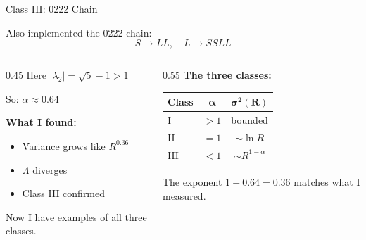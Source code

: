 \documentclass[aspectratio=169, 11pt]{beamer}
\begin{document}
\begin{frame}{Class III: 0222 Chain}

Also implemented the 0222 chain:
\[
S \to LL, \quad L \to SSLL
\]

\begin{columns}[T]
\begin{column}{0.45\textwidth}
\vspace{0.5em}
Here $|\lambda_2| = \sqrt{5} - 1 > 1$

So: $\alpha \approx 0.64$

\vspace{0.5em}
\textbf{What I found:}
\begin{itemize}
    \item Variance grows like $R^{0.36}$
    \item $\bar{\Lambda}$ diverges
    \item Class III confirmed
\end{itemize}

\vspace{0.5em}
Now I have examples of all three classes.
\end{column}

\begin{column}{0.55\textwidth}
\centering
\small
\textbf{The three classes:}
\vspace{0.3em}

\begin{tabular}{lcc}
\toprule
\textbf{Class} & $\boldsymbol{\alpha}$ & $\boldsymbol{\sigma^2(R)}$ \\
\midrule
I & $> 1$ & bounded \\
II & $= 1$ & $\sim \ln R$ \\
III & $< 1$ & $\sim R^{1-\alpha}$ \\
\bottomrule
\end{tabular}

\vspace{1em}
The exponent $1 - 0.64 = 0.36$ matches what I measured.
\end{column}
\end{columns}
\end{frame}
\end{document}
